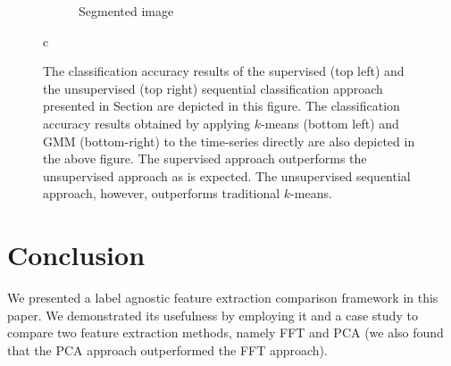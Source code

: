\documentclass{article}
\begin{document}
\begin{figure}[h]
\begin{subfigure}[b]{0.49\linewidth}
    \caption{Segmented image} 
    \label{fig7:d} 
  \end{subfigure} 
  \caption{c}
  \label{fig7} 
  \caption{The classification accuracy results of the supervised (top left) and the unsupervised (top right) sequential classification approach presented in Section are depicted in this figure. The classification
  accuracy results obtained by applying $k$-means (bottom left) and GMM (bottom-right) to the time-series directly are also depicted in the above figure. The supervised approach outperforms the 
  unsupervised approach as is expected. The unsupervised sequential approach, however, outperforms traditional $k$-means.}
\end{figure}





\section{Conclusion}
\label{sec:ref}
We presented a label agnostic feature extraction comparison framework in this paper. We demonstrated its usefulness by employing it and a case study to compare two feature extraction methods,
namely FFT and PCA (we also found that the PCA approach outperformed the FFT approach).




\end{document}
